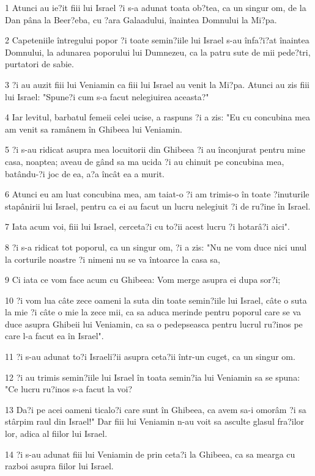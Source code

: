 \par 1 Atunci au ie?it fiii lui Israel ?i s-a adunat toata ob?tea, ca un singur om, de la Dan pâna la Beer?eba, cu ?ara Galaadului, înaintea Domnului la Mi?pa.
\par 2 Capeteniile întregului popor ?i toate semin?iile lui Israel s-au înfa?i?at înaintea Domnului, la adunarea poporului lui Dumnezeu, ca la patru sute de mii pede?tri, purtatori de sabie.
\par 3 ?i au auzit fiii lui Veniamin ca fiii lui Israel au venit la Mi?pa. Atunci au zis fiii lui Israel: "Spune?i cum s-a facut nelegiuirea aceasta?"
\par 4 Iar levitul, barbatul femeii celei ucise, a raspuns ?i a zis: "Eu cu concubina mea am venit sa ramânem în Ghibeea lui Veniamin.
\par 5 ?i s-au ridicat asupra mea locuitorii din Ghibeea ?i au înconjurat pentru mine casa, noaptea; aveau de gând sa ma ucida ?i au chinuit pe concubina mea, batându-?i joc de ea, a?a încât ea a murit.
\par 6 Atunci eu am luat concubina mea, am taiat-o ?i am trimis-o în toate ?inuturile stapânirii lui Israel, pentru ca ei au facut un lucru nelegiuit ?i de ru?ine în Israel.
\par 7 Iata acum voi, fiii lui Israel, cerceta?i cu to?ii acest lucru ?i hotarâ?i aici".
\par 8 ?i s-a ridicat tot poporul, ca un singur om, ?i a zis: "Nu ne vom duce nici unul la corturile noastre ?i nimeni nu se va întoarce la casa sa,
\par 9 Ci iata ce vom face acum cu Ghibeea: Vom merge asupra ei dupa sor?i;
\par 10 ?i vom lua câte zece oameni la suta din toate semin?iile lui Israel, câte o suta la mie ?i câte o mie la zece mii, ca sa aduca merinde pentru poporul care se va duce asupra Ghibeii lui Veniamin, ca sa o pedepseasca pentru lucrul ru?inos pe care l-a facut ea în Israel".
\par 11 ?i s-au adunat to?i Israeli?ii asupra ceta?ii într-un cuget, ca un singur om.
\par 12 ?i au trimis semin?iile lui Israel în toata semin?ia lui Veniamin sa se spuna: "Ce lucru ru?inos s-a facut la voi?
\par 13 Da?i pe acei oameni ticalo?i care sunt în Ghibeea, ca avem sa-i omorâm ?i sa stârpim raul din Israel!" Dar fiii lui Veniamin n-au voit sa asculte glasul fra?ilor lor, adica al fiilor lui Israel.
\par 14 ?i s-au adunat fiii lui Veniamin de prin ceta?i la Ghibeea, ca sa mearga cu razboi asupra fiilor lui Israel.
